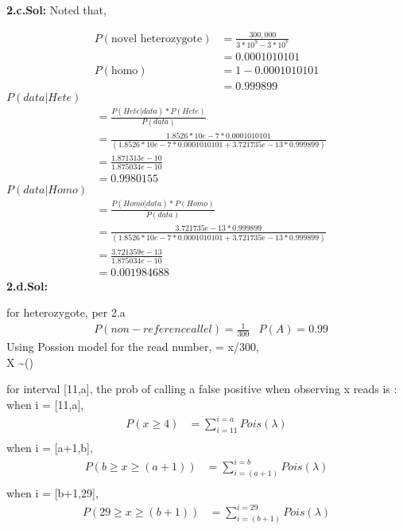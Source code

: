 \documentclass[a4paper,11pt]{article}\usepackage{graphicx, color}
\begin{document}
\textbf{2.c.Sol:} Noted that, 

\begin{align}
	P(\text{novel heterozygote}) & = \frac{300,000}{3*10^9-3*10^7} \\ 
		& = 0.0001010101 \\
	P(\text{homo}) & = 1- 0.0001010101 \\
		& = 0.999899
\end{align}
$P(data|Hete)$
\begin{align}
	&= \frac{P(Hete|data)*P(Hete)}{P(data)} \\
	&= \frac{1.8526 * 10e-7 * 0.0001010101 }{(1.8526 * 10e-7 * 0.0001010101+ 3.721735e-13 * 0.999899)} \\  
	&= \frac{1.871313e-10}{ 1.875034e-10} \\
	&= 0.9980155
\end{align}
 $P(data|Homo)$
\begin{align} 
	&= \frac{P(Homo|data)*P(Homo)}{P(data)} \\
	&= \frac{3.721735e-13 * 0.999899}{(1.8526 * 10e-7 * 0.0001010101+ 3.721735e-13 * 0.999899)} \\  
	&= \frac{3.721359e-13}{1.875034e-10} \\
	&= 0.001984688
\end{align}
\textbf{2.d.Sol:} 

for heterozygote, per 2.a 
\begin{align}
& P(non-reference allel) = \frac{1}{300}
& P(A) = 0.99
\end{align}
Using Possion model for the read number, \lambda = x/300, \\
X \sim {}\left({\lambda}\right)

for interval [11,a], the prob of calling a false positive when observing x reads is : \\
when i = [11,a], 
\begin{align}
P( x \geq 4) & = \sum_{i=11}^{i=a}{Pois}\left({\lambda}\right) \\
\end{align}
when i = [a+1,b], 
\begin{align}
P(b \geq x \geq (a+1)) & = \sum_{i=(a+1)}^{i=b}{Pois}\left({\lambda}\right) \\
\end{align}
when i = [b+1,29], 
\begin{align}
P(29 \geq x \geq (b+1)) & = \sum_{i=(b+1)}^{i=29}{Pois}\left({\lambda}\right) \\
\end{align}  
\end{document}
